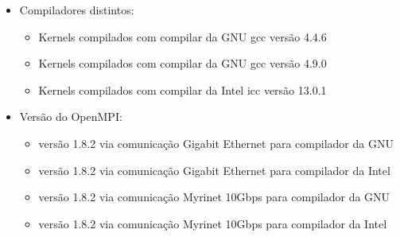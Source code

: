 \documentclass[conference,compsoc]{IEEEtran}
\begin{document}
\begin{itemize}
\item Compiladores distintos:
\begin{itemize}
\item Kernels compilados com compilar da GNU gcc versão 4.4.6
\item Kernels compilados com compilar da GNU gcc versão 4.9.0
\item Kernels compilados com compilar da Intel icc versão 13.0.1
\end{itemize}
\item Versão do OpenMPI:
\begin{itemize}
\item versão 1.8.2 via comunicação Gigabit Ethernet para compilador da GNU
\item versão 1.8.2 via comunicação Gigabit Ethernet para compilador da Intel
\item versão 1.8.2 via comunicação Myrinet 10Gbps para compilador da GNU
\item versão 1.8.2 via comunicação Myrinet 10Gbps para compilador da Intel

\end{itemize}
\end{itemize}



%
%

\end{document}
